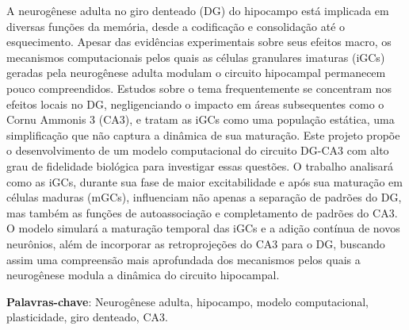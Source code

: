 \setlength{\absparsep}{18pt} %

\begin{resumo}

A neurogênese adulta no giro denteado (DG) do hipocampo está implicada em diversas funções da memória, desde a codificação e
consolidação até o esquecimento. Apesar das evidências experimentais sobre seus efeitos macro, os mecanismos computacionais pelos
quais as células granulares imaturas (iGCs) geradas pela neurogênese adulta modulam o circuito hipocampal permanecem pouco
compreendidos. Estudos sobre o tema frequentemente se concentram nos efeitos locais no DG, negligenciando o impacto em áreas
subsequentes como o Cornu Ammonis 3 (CA3), e tratam as iGCs como uma população estática, uma simplificação que não captura a
dinâmica de sua maturação. Este projeto propõe o desenvolvimento de um modelo computacional do circuito DG-CA3 com alto grau de
fidelidade biológica para investigar essas questões. O trabalho analisará como as iGCs, durante sua fase de maior excitabilidade e
após sua maturação em células maduras (mGCs), influenciam não apenas a separação de padrões do DG, mas também as funções de
autoassociação e completamento de padrões do CA3. O modelo simulará a maturação temporal das iGCs e a adição contínua de novos
neurônios, além de incorporar as retroprojeções do CA3 para o DG, buscando assim uma compreensão mais aprofundada dos mecanismos
pelos quais a neurogênese modula a dinâmica do circuito hipocampal.

\noindent\textbf{Palavras-chave}: Neurogênese adulta, hipocampo, modelo computacional, plasticidade, giro denteado, CA3.
\end{resumo}

   




